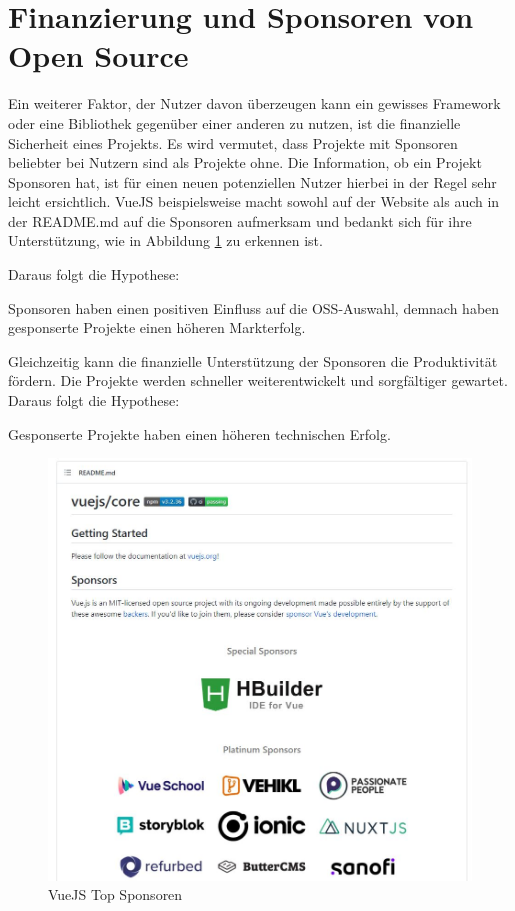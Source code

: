 \section{Finanzierung und Sponsoren von Open Source}\label{sec:sponsors}

Ein weiterer Faktor, der Nutzer davon überzeugen kann ein gewisses Framework oder eine Bibliothek 
gegenüber einer anderen zu nutzen, ist die finanzielle Sicherheit eines Projekts. Es wird vermutet,
dass Projekte mit Sponsoren beliebter bei Nutzern sind als Projekte ohne.
Die Information, ob ein Projekt Sponsoren hat, ist für einen neuen potenziellen Nutzer hierbei in der
Regel sehr leicht ersichtlich. 
VueJS beispielsweise macht sowohl auf der Website als auch in der README.md auf die Sponsoren aufmerksam
und bedankt sich für ihre Unterstützung, wie in Abbildung \ref{abb:VueJS_Sponsors} zu erkennen ist.

Daraus folgt die Hypothese:

\begin{hypothesis}
    Sponsoren haben einen positiven Einfluss auf die OSS-Auswahl, demnach haben gesponserte Projekte
    einen höheren Markterfolg.
    \label{H:6} %
\end{hypothesis}

\noindent
Gleichzeitig kann die finanzielle Unterstützung der Sponsoren die Produktivität fördern.
Die Projekte werden schneller weiterentwickelt und sorgfältiger gewartet. Daraus folgt die 
Hypothese:

\begin{hypothesis}
    Gesponserte Projekte haben einen höheren technischen Erfolg.
    \label{H:7} %
\end{hypothesis}

\begin{figure}[h]
    \centering
    \includegraphics[scale=0.6]{figures/02/VueSponsoren.JPG}
    \caption{VueJS Top Sponsoren}
    \label{abb:VueJS_Sponsors}
\end{figure}
